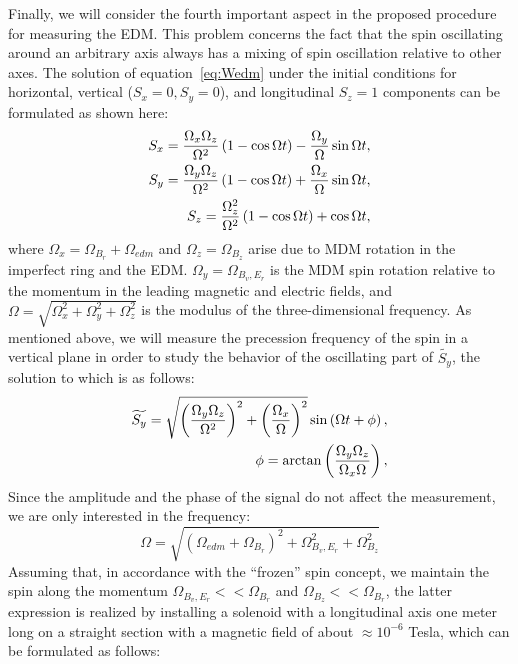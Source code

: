 \documentclass[a4paper]{jacow}
\begin{document}
Finally, we will consider the fourth important aspect in the proposed procedure for measuring the EDM. This problem concerns the fact that the spin oscillating around an arbitrary axis always has a mixing of spin oscillation relative to other axes. The solution of equation~\eqref{eq:Wedm} under the initial conditions for horizontal, vertical ($S_x=0, S_y=0$), and longitudinal  $S_z=1$ components  can be formulated as shown here:
\begin{align}
S_x=\frac{\Omega_x\Omega_z}{\Omega^{2}}\left(1-\cos\Omega t\right)-\frac{\Omega_y}{\Omega}\sin\Omega t, \notag\\
S_y=\frac{\Omega_y\Omega_z}{\Omega^{2}}\left(1-\cos\Omega t\right)+\frac{\Omega_x}{\Omega}\sin\Omega t, \notag\\
S_z=\frac{\Omega_z^{2}}{\Omega^{2}}\left(1-\cos\Omega t\right)+\cos\Omega t,
\end{align}
where $\Omega_x=\Omega_{B_r}+\Omega_{edm}$   and $\Omega_z=\Omega_{B_z}$  arise due to MDM rotation in the imperfect ring and the EDM. $\Omega_{y}=\Omega_{B_{v},E_{r}}$  is the MDM spin rotation relative to the momentum in the leading magnetic and electric fields, and $\Omega=\sqrt{\Omega_x^{2}+\Omega_y^{2}+\Omega_z^{2}}$   is the modulus of the three-dimensional frequency. As mentioned above, we will measure the precession frequency of the spin in a vertical plane in order to study the behavior of the oscillating part of $\widetilde{S_y}$, the solution to which is as follows:
\begin{align}
\widetilde{S_y}=\sqrt{\left(\frac{\Omega_y\Omega_z}{\Omega^{2}}\right)^{2}+\left(\frac{\Omega_x}{\Omega}\right)^{2}}\sin\left(\Omega t+\phi\right), \notag\\
\phi=\arctan\left(\frac{\Omega_y\Omega_z}{\Omega_x\Omega}\right),
\end{align}
Since the amplitude and the phase of the signal do not affect the measurement, we are only interested in the frequency:
\begin{equation}\label{eq:Omega}
\Omega=\sqrt{\left(\Omega_{edm}+\Omega_{B_r}\right)^{2}+\Omega_{B_v,E_r}^{2}+\Omega_{B_z}^{2}}	
\end{equation}
Assuming that, in accordance with the ``frozen'' spin concept, we maintain the spin along the momentum $\Omega_{B_v,E_r}<<\Omega_{B_r}$  and $\Omega_{B_z}<<\Omega_{B_r}$, the latter expression is realized by installing a solenoid with a longitudinal axis one meter long on a straight section with a magnetic field of about $\approx 10^{-6}$  Tesla, which can be formulated as follows:
\end{document}
